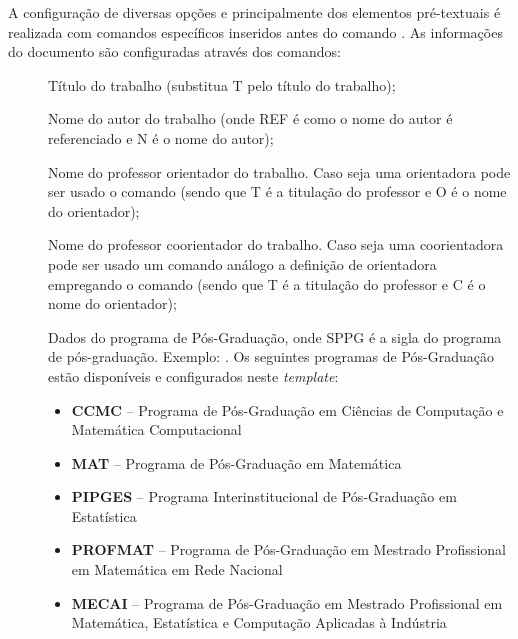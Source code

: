 A configuração de diversas opções e principalmente dos elementos pré-textuais é realizada com comandos específicos inseridos antes do comando . As informações do documento são configuradas através dos comandos:

\begin{description}

 \item[] Título do trabalho (substitua T pelo título do trabalho);

 \item[] Nome do autor do trabalho (onde REF é como o nome do autor é referenciado e N é o nome do autor);

 \item[] Nome do professor orientador do trabalho. Caso seja uma orientadora pode ser usado o comando  (sendo que T é a titulação do professor e O é o nome do orientador);

 \item[] Nome do professor coorientador do trabalho. Caso seja uma coorientadora pode ser usado um comando análogo a definição de orientadora  empregando o comando (sendo que T é a titulação do professor e C é o nome do orientador);

 
 \item[] Dados do programa de Pós-Graduação, onde SPPG é a sigla do programa de pós-graduação. Exemplo: . Os seguintes programas de Pós-Graduação estão disponíveis e configurados neste \textit{template}:
    \begin{itemize}
        \item \textbf{CCMC} -- Programa de Pós-Graduação em Ciências de Computação e Matemática Computacional
        \item \textbf{MAT} -- Programa de Pós-Graduação em Matemática
        \item \textbf{PIPGES} -- Programa Interinstitucional de Pós-Graduação em Estatística
        \item \textbf{PROFMAT} -- Programa de Pós-Graduação em Mestrado Profissional em Matemática em Rede Nacional
        \item \textbf{MECAI} -- Programa de Pós-Graduação em Mestrado Profissional em Matemática, Estatística e Computação Aplicadas à Indústria
    \end{itemize}
 

\end{description}
